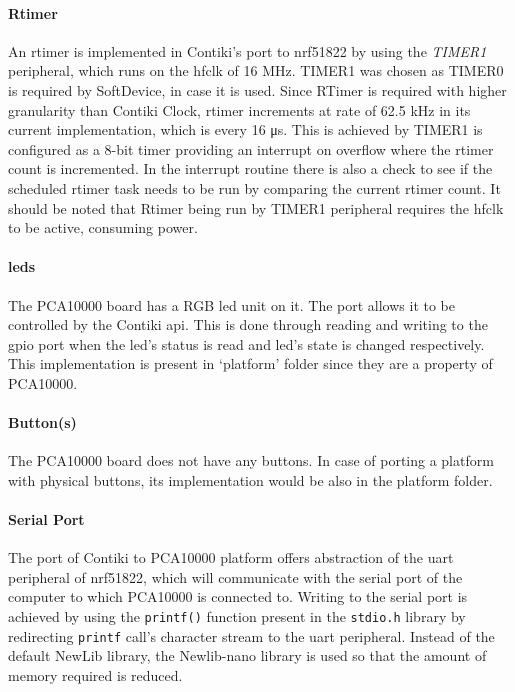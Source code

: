 \paragraph{Rtimer}
An rtimer is implemented in Contiki's port to nrf51822 by using the \emph{TIMER1} peripheral, which runs on the \gls{hfclk} of 16 MHz. TIMER1 was chosen as TIMER0 is required by SoftDevice, in case it is used. Since RTimer is required with higher granularity than Contiki Clock, rtimer increments at rate of 62.5 kHz in its current implementation, which is every 16 \si{\micro \second}. This is achieved by TIMER1 is configured as a 8-bit timer providing an interrupt on overflow where the rtimer count is incremented. In the interrupt routine there is also a check to see if the scheduled rtimer task needs to be run by comparing the current rtimer count. It should be noted that Rtimer being run by TIMER1 peripheral requires the \gls{hfclk} to be active, consuming power.

\paragraph{\glspl{led}} 
The PCA10000 board has a RGB \gls{led} unit on it. The port allows it to be controlled by the Contiki \gls{api}. This is done through reading and writing to the \gls{gpio} port when the \gls{led}'s status is read and \gls{led}'s state is changed respectively. This implementation is present in `platform' folder since they are a property of PCA10000.

\paragraph{Button(s)}
The PCA10000 board does not have any buttons. In case of porting a platform with physical buttons, its implementation would be also in the platform folder.

\paragraph{Serial Port}
The port of Contiki to PCA10000 platform offers abstraction of the \gls{uart} peripheral of nrf51822, which will communicate with the serial port of the computer to which PCA10000 is connected to. Writing to the serial port is achieved by using the \texttt{printf()} function present in the \texttt{stdio.h} library by redirecting \texttt{printf} call's character stream to the \gls{uart} peripheral. Instead of the default NewLib library, the Newlib-nano library is used so that the amount of memory required is reduced.

